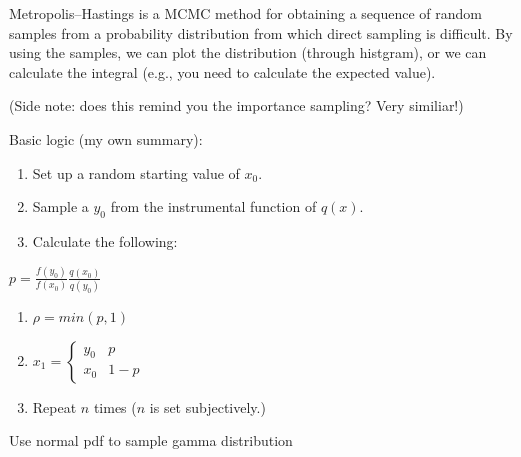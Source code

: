 \documentclass[]{book}
\begin{document}
Metropolis--Hastings is a MCMC method for obtaining a sequence of random
samples from a probability distribution from which direct sampling is
difficult. By using the samples, we can plot the distribution (through
histgram), or we can calculate the integral (e.g., you need to calculate
the expected value).

(Side note: does this remind you the importance sampling? Very
similiar!)

Basic logic (my own summary):

\begin{enumerate}
\def\labelenumi{(\arabic{enumi})}
\item
  Set up a random starting value of \(x_0\).
\item
  Sample a \(y_0\) from the instrumental function of \(q(x)\).
\item
  Calculate the following:
\end{enumerate}

\(p =\frac{f(y_0)}{f(x_0)}\frac{q(x_0)}{q(y_0)}\)

\begin{enumerate}
\def\labelenumi{(\arabic{enumi})}
\setcounter{enumi}{3}
\item
  \(\rho=min(p, 1)\)
\item
  \(x_{1}=\begin{cases} y_0 & p \\ x_0 & 1-p \end{cases}\)
\item
  Repeat \(n\) times (\(n\) is set subjectively.)
\end{enumerate}

Use normal pdf to sample gamma distribution
\end{document}
